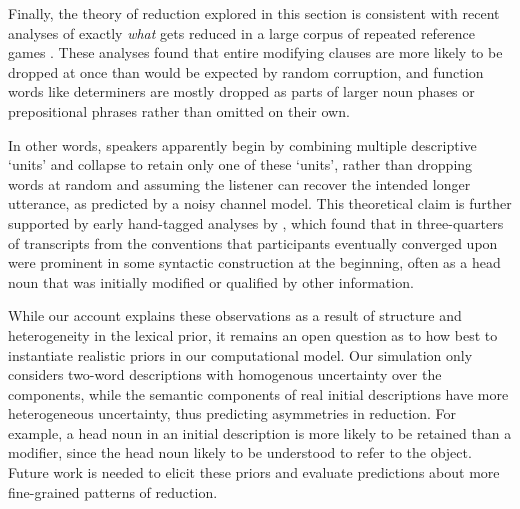 Finally, the theory of reduction explored in this section is consistent with recent analyses of exactly \emph{what} gets reduced in a large corpus of repeated reference games \cite{hawkins2020characterizing}.
These analyses found that entire modifying clauses are more likely to be dropped at once than would be expected by random corruption, and function words like determiners are mostly dropped as parts of larger noun phases or prepositional phrases rather than omitted on their own. 


In other words, speakers apparently begin by combining multiple descriptive `units' and collapse to retain only one of these `units', rather than dropping words at random and assuming the listener can recover the intended longer utterance, as predicted by a noisy channel model.
This theoretical claim is further supported by early hand-tagged analyses by , which found that in three-quarters of transcripts from  the conventions that participants eventually converged upon were prominent in some syntactic construction at the beginning, often as a head noun that was initially modified or qualified by other information. 

While our account explains these observations as a result of structure and heterogeneity in the lexical prior, it remains an open question as to how best to instantiate  realistic priors in our computational model. 
Our simulation only considers two-word descriptions with homogenous uncertainty over the components, while the semantic components of real initial descriptions have more heterogeneous uncertainty, thus predicting asymmetries in reduction. For example, a head noun in an initial description is more likely to be retained than a modifier, since the head noun likely to be understood to refer to the object.  
Future work is needed to elicit these priors and evaluate predictions about more fine-grained patterns of reduction.






